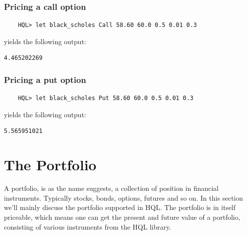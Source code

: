 \documentclass[11pt,a4paper]{article}
\numberwithin{equation}{section}
\begin{document}
\FrameSep

\subsubsection{Pricing a call option}

        \begin{lstlisting}	
	HQL> let black_scholes Call 58.60 60.0 0.5 0.01 0.3
	\end{lstlisting}
yields the following output:
	\FrameSep
	\begin{lstlisting}[style=Output]
	4.465202269
	\end{lstlisting}


\subsubsection{Pricing a put option}
        \begin{lstlisting}	
	HQL> let black_scholes Put 58.60 60.0 0.5 0.01 0.3
	\end{lstlisting}
yields the following output:
	\FrameSep
	\begin{lstlisting}[style=Output]
	5.565951021
	\end{lstlisting}

	\section{The Portfolio}
	A portfolio, is as the name suggests, a collection of position in financial instruments. Typically stocks, bonds, options, futures and so on. In this section we'll mainly discuss the portfolio supported in HQL. The portfolio is in itself priceable, which means one can get the present and future value of a portfolio, consisting of various instruments from the HQL library.
\end{document}
